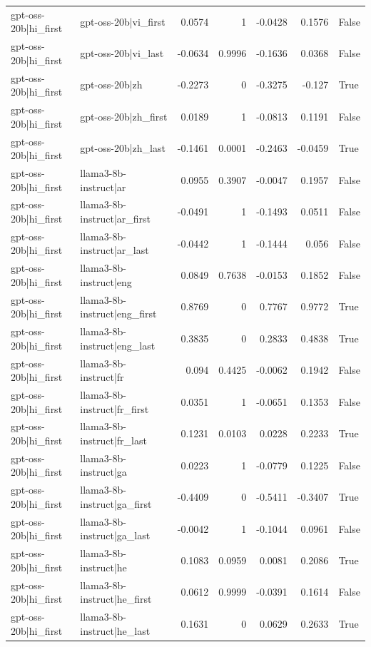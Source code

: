 \begin{table}
\begin{tabular}{l l r r r r l}
gpt-oss-20b|hi_first & gpt-oss-20b|vi_first & 0.0574 & 1 & -0.0428 & 0.1576 & False \\
gpt-oss-20b|hi_first & gpt-oss-20b|vi_last & -0.0634 & 0.9996 & -0.1636 & 0.0368 & False \\
gpt-oss-20b|hi_first & gpt-oss-20b|zh & -0.2273 & 0 & -0.3275 & -0.127 & True \\
gpt-oss-20b|hi_first & gpt-oss-20b|zh_first & 0.0189 & 1 & -0.0813 & 0.1191 & False \\
gpt-oss-20b|hi_first & gpt-oss-20b|zh_last & -0.1461 & 0.0001 & -0.2463 & -0.0459 & True \\
gpt-oss-20b|hi_first & llama3-8b-instruct|ar & 0.0955 & 0.3907 & -0.0047 & 0.1957 & False \\
gpt-oss-20b|hi_first & llama3-8b-instruct|ar_first & -0.0491 & 1 & -0.1493 & 0.0511 & False \\
gpt-oss-20b|hi_first & llama3-8b-instruct|ar_last & -0.0442 & 1 & -0.1444 & 0.056 & False \\
gpt-oss-20b|hi_first & llama3-8b-instruct|eng & 0.0849 & 0.7638 & -0.0153 & 0.1852 & False \\
gpt-oss-20b|hi_first & llama3-8b-instruct|eng_first & 0.8769 & 0 & 0.7767 & 0.9772 & True \\
gpt-oss-20b|hi_first & llama3-8b-instruct|eng_last & 0.3835 & 0 & 0.2833 & 0.4838 & True \\
gpt-oss-20b|hi_first & llama3-8b-instruct|fr & 0.094 & 0.4425 & -0.0062 & 0.1942 & False \\
gpt-oss-20b|hi_first & llama3-8b-instruct|fr_first & 0.0351 & 1 & -0.0651 & 0.1353 & False \\
gpt-oss-20b|hi_first & llama3-8b-instruct|fr_last & 0.1231 & 0.0103 & 0.0228 & 0.2233 & True \\
gpt-oss-20b|hi_first & llama3-8b-instruct|ga & 0.0223 & 1 & -0.0779 & 0.1225 & False \\
gpt-oss-20b|hi_first & llama3-8b-instruct|ga_first & -0.4409 & 0 & -0.5411 & -0.3407 & True \\
gpt-oss-20b|hi_first & llama3-8b-instruct|ga_last & -0.0042 & 1 & -0.1044 & 0.0961 & False \\
gpt-oss-20b|hi_first & llama3-8b-instruct|he & 0.1083 & 0.0959 & 0.0081 & 0.2086 & True \\
gpt-oss-20b|hi_first & llama3-8b-instruct|he_first & 0.0612 & 0.9999 & -0.0391 & 0.1614 & False \\
gpt-oss-20b|hi_first & llama3-8b-instruct|he_last & 0.1631 & 0 & 0.0629 & 0.2633 & True \\

\end{tabular}
\end{table}
